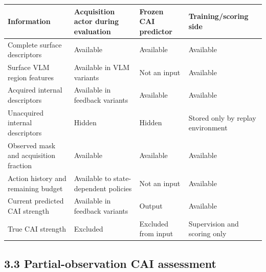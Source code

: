 { %
\begin{center}\begin{minipage}{\linewidth}\small
\begin{tabular}{@{}
  >{\raggedright\arraybackslash}p{}
  >{\raggedright\arraybackslash}p{}
  >{\raggedright\arraybackslash}p{}
  >{\raggedright\arraybackslash}p{}@{}}
\toprule\noalign{}
\begin{minipage}[b]{\linewidth}\raggedright
Information
\end{minipage} & \begin{minipage}[b]{\linewidth}\raggedright
Acquisition actor during evaluation
\end{minipage} & \begin{minipage}[b]{\linewidth}\raggedright
Frozen CAI predictor
\end{minipage} & \begin{minipage}[b]{\linewidth}\raggedright
Training/scoring side
\end{minipage} \\
\midrule\noalign{}



Complete surface descriptors & Available & Available & Available \\
Surface VLM region features & Available in VLM variants & Not an input & Available \\
Acquired internal descriptors & Available in feedback variants & Available & Available \\
Unacquired internal descriptors & Hidden & Hidden & Stored only by replay environment \\
Observed mask and acquisition fraction & Available & Available & Available \\
Action history and remaining budget & Available to state-dependent policies & Not an input & Available \\
Current predicted CAI strength & Available in feedback variants & Output & Available \\
True CAI strength & Excluded & Excluded from input & Supervision and scoring only \\
\bottomrule\end{tabular}
\end{minipage}\end{center}
}

\subsection{3.3 Partial-observation CAI assessment}\label{partial-observation-cai-assessment}

